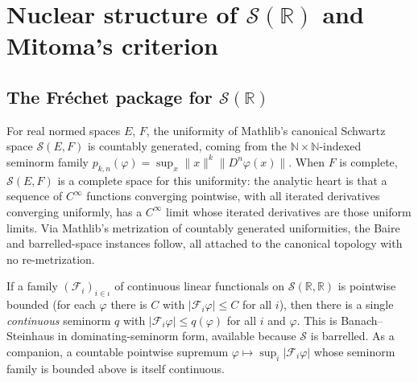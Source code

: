 
\chapter{Nuclear structure of \texorpdfstring{$\mathcal{S}(\mathbb{R})$}{S(R)} and Mitoma's criterion}

\section{The Fréchet package for \texorpdfstring{$\mathcal{S}(\mathbb{R})$}{S(R)}}

\begin{theorem}\label{thm:mit-frechet-instances}
  \leanok
  For real normed spaces $E$, $F$, the uniformity of Mathlib's canonical Schwartz space
  $\mathcal{S}(E,F)$ is countably generated, coming from the $\mathbb{N}\times\mathbb{N}$-indexed
  seminorm family $p_{k,n}(\varphi) = \sup_x \|x\|^k \|D^n\varphi(x)\|$.  When $F$ is complete,
  $\mathcal{S}(E,F)$ is a complete space for this uniformity: the analytic heart is that a
  sequence of $C^\infty$ functions converging pointwise, with all iterated derivatives converging
  uniformly, has a $C^\infty$ limit whose iterated derivatives are those uniform limits.
  Via Mathlib's metrization of countably generated uniformities, the Baire and barrelled-space
  instances follow, all attached to the canonical topology with no re-metrization.
\end{theorem}

\begin{theorem}\label{thm:mit-banach-steinhaus}
  \leanok
  If a family $(\mathcal{F}_i)_{i \in \iota}$ of continuous linear functionals on
  $\mathcal{S}(\mathbb{R},\mathbb{R})$ is pointwise bounded (for each $\varphi$ there is $C$ with
  $|\mathcal{F}_i \varphi| \le C$ for all $i$), then there is a single \emph{continuous} seminorm
  $q$ with $|\mathcal{F}_i \varphi| \le q(\varphi)$ for all $i$ and $\varphi$.  This is
  Banach--Steinhaus in dominating-seminorm form, available because $\mathcal{S}$ is barrelled.
  As a companion, a countable pointwise supremum $\varphi \mapsto \sup_i |\mathcal{F}_i \varphi|$
  whose seminorm family is bounded above is itself continuous.
\end{theorem}

